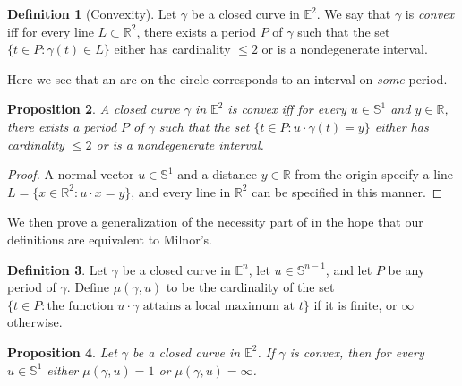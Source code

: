 \documentclass{amsart}
\newtheorem{proposition}{Proposition}[section]
\theoremstyle{definition}
\newtheorem{definition}[proposition]{Definition}
\theoremstyle{remark}
\begin{document}
\begin{definition}[Convexity]
    Let $\gamma$ be a closed curve in $\mathbb{E}^2$.
    We say that $\gamma$ is \emph{convex} iff
    for every line $L\subset\mathbb{R}^2$,
    there exists a period $P$ of $\gamma$ such that
    the set $\{t\in P:\gamma(t)\in L\}$ either
    has cardinality $\le2$ or is a nondegenerate interval.
\end{definition}

Here we see that an arc on the circle corresponds
to an interval on \emph{some} period.

\begin{proposition}
    A closed curve $\gamma$ in $\mathbb{E}^2$ is convex iff
    for every $u\in\mathbb{S}^1$ and $y\in\mathbb{R}$,
    there exists a period $P$ of $\gamma$ such that
    the set $\{t\in P:u\cdot\gamma(t)=y\}$ either
    has cardinality $\le2$ or is a nondegenerate interval.
\end{proposition}

\begin{proof}
    A normal vector $u\in\mathbb{S}^1$ and
    a distance $y\in\mathbb{R}$ from the origin specify
    a line $L=\{x\in\mathbb{R}^2:u\cdot x=y\}$, and
    every line in $\mathbb{R}^2$ can be specified in this manner.
\end{proof}

We then prove a generalization of the necessity part
of \cite[Lemma 3.3]{milnor} in the hope that
our definitions are equivalent to Milnor's.

\begin{definition}
    Let $\gamma$ be a closed curve in $\mathbb{E}^n$,
    let $u\in\mathbb{S}^{n-1}$,
    and let $P$ be any period of $\gamma$.
    Define $\mu(\gamma,u)$ to be the cardinality of the set
    $\{t\in P:\text{the function }u\cdot\gamma\text{ attains a local maximum at }t\}$
    if it is finite, or $\infty$ otherwise.
\end{definition}

\begin{proposition}
    Let $\gamma$ be a closed curve in $\mathbb{E}^2$.
    If $\gamma$ is convex, then for every $u\in\mathbb{S}^1$
    either $\mu(\gamma,u)=1$ or $\mu(\gamma,u)=\infty$.
\end{proposition}
\end{document}
